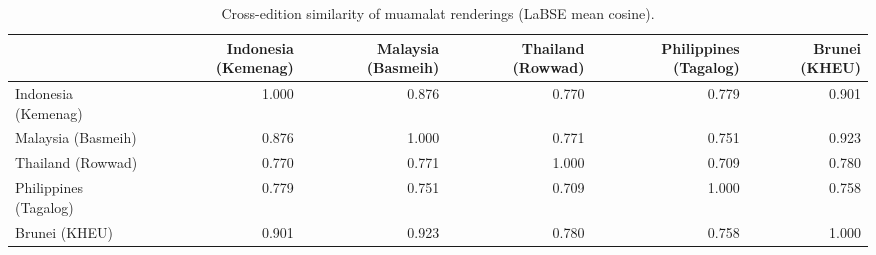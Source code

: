 \begin{table}[!h]
\centering
\caption{Cross-edition similarity of muamalat renderings (LaBSE mean cosine).}
\centering
\begin{tabular}[t]{lrrrrr}
\toprule
  & Indonesia (Kemenag) & Malaysia (Basmeih) & Thailand (Rowwad) & Philippines (Tagalog) & Brunei (KHEU)\\
\midrule
Indonesia (Kemenag) & 1.000 & 0.876 & 0.770 & 0.779 & 0.901\\
Malaysia (Basmeih) & 0.876 & 1.000 & 0.771 & 0.751 & 0.923\\
Thailand (Rowwad) & 0.770 & 0.771 & 1.000 & 0.709 & 0.780\\
Philippines (Tagalog) & 0.779 & 0.751 & 0.709 & 1.000 & 0.758\\
Brunei (KHEU) & 0.901 & 0.923 & 0.780 & 0.758 & 1.000\\
\bottomrule
\end{tabular}
\end{table}
